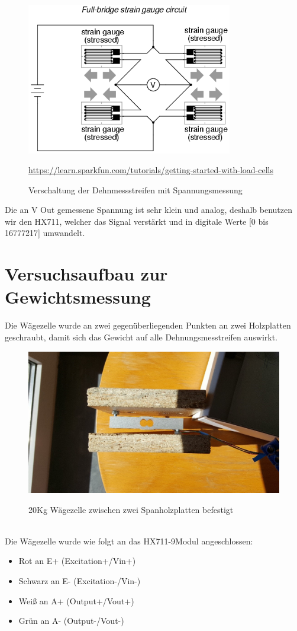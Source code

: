 \begin{figure}[ht]
    \center
    \includegraphics[width=9cm]{Bilder/waegezelle-full.png}\\
    \caption{Verschaltung der Dehnmessstreifen mit Spannungsmessung}
    \begin{flushleft} \quelle\url{https://learn.sparkfun.com/tutorials/getting-started-with-load-cells} \end{flushleft}
\end{figure}
Die an V Out gemessene Spannung ist sehr klein und analog, deshalb benutzen wir den HX711, welcher das Signal verstärkt und in digitale Werte [0 bis 16777217] umwandelt. 
\newpage


\section{Versuchsaufbau zur Gewichtsmessung}
Die Wägezelle wurde an zwei gegenüberliegenden Punkten an zwei Holzplatten geschraubt, damit sich das Gewicht auf alle Dehnungsmesstreifen auswirkt.\\
\begin{figure}[ht]
    \center
    \includegraphics[width=15cm]{Bilder/waegezelle.jpg}\\
    \caption{20Kg Wägezelle zwischen zwei Spanholzplatten befestigt}
\end{figure}\\
Die Wägezelle wurde wie folgt an das HX711-9Modul angeschlossen: 
\begin{itemize}
    \item Rot an E+ (Excitation+/Vin+) 
    \item Schwarz an E- (Excitation-/Vin-) 
    \item Weiß an A+ (Output+/Vout+) 
    \item Grün an A- (Output-/Vout-) 
\end{itemize}


